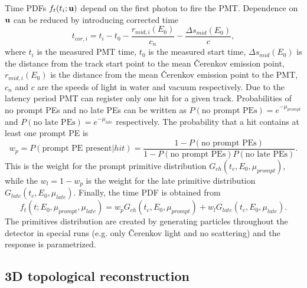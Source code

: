 Time PDFs $f_t(t_i;{\bf u})$ depend on the first photon to fire
the PMT. Dependence on ${\bf u}$ can be reduced by introducing
corrected time
\begin{equation}
	t_{cor,i}=t_i-t_0-\frac{r_{mid,i}(E_0)}{c_n}-\frac{\Delta s_{mid}(E_0)}{c},
\end{equation}
where $t_i$ is the measured PMT time, $t_0$ is the measured start time,
$\Delta s_{mid}(E_0)$ is the distance from the track start point to
the mean \v{C}erenkov emission point, $r_{mid,i}(E_0)$ is the distance
from the mean \v{C}erenkov emission point to the PMT, $c_n$ and $c$ are
the speeds of light in water and vacuum respectively. 
Due to the latency period PMT can register only one hit for a given track.
Probabilities of no prompt PEs and no late PEs can be written as
$P(\text{no prompt PEs}) = e^{-\mu_{prompt}}$ and $P(\text{no late PEs}) = e^{-\mu_{late}}$ 
respectively. The probability that a hit contains at least one prompt PE is
\begin{equation}
	w_p=P(\text{prompt PE present}|hit) =\frac{1-P(\text{no prompt PEs})}{1-P(\text{no prompt PEs})P(\text{no late PEs})}.
\end{equation}
This is the weight for the prompt primitive distribution $G_{ch}(t_c,E_0,\mu_{prompt})$, while the $w_l=1-w_p$ is the
weight for the late primitive distribution $G_{late}(t_c,E_0,\mu_{late})$. Finally, the time PDF is
obtained from
\begin{equation}
	f_t(t;E_0,\mu_{prompt},\mu_{late})=w_p G_{ch}(t_c,E_0,\mu_{prompt})+w_l G_{late}(t_c,E_0,\mu_{late}).
\end{equation}
The primitives distribution are created by generating particles throughout the detector in
special runs (e.g. only \v{C}erenkov light and no scattering) and the response is parametrized. 

\subsection{3D topological reconstruction}

